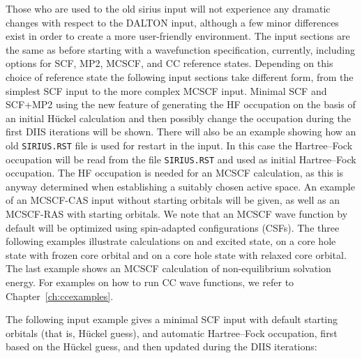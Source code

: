 Those who are used to the old {\sc sirius} input will not
experience any dramatic changes with respect to the DALTON input,
although a few minor differences exist in order to create a more
user-friendly environment. The input sections are the same as
before starting with a wavefunction specification, currently,
including options for SCF, MP2, MCSCF, and CC reference states.
Depending on this choice of reference state the following input
sections take different form, from the simplest SCF input to the
more complex MCSCF input. Minimal SCF and SCF+MP2
using the new feature of generating the HF
occupation on the basis of an initial H\"{u}ckel
calculation and then possibly change the
occupation during the first DIIS iterations will be
shown. There will also be an example showing how an old
\verb|SIRIUS.RST| file is used for restart in the
input. 
In this case the Hartree--Fock occupation will be read from
the file \verb|SIRIUS.RST| and used as initial Hartree--Fock
occupation.
The HF occupation is
needed for an MCSCF calculation, as this is anyway
determined when establishing a suitably chosen active
space. An example of an
MCSCF-CAS input without starting
orbitals will be given, as well as an
MCSCF-RAS with starting orbitals. We note that an
MCSCF wave function by default will be optimized using
spin-adapted configurations
(CSFs).
The three
following examples illustrate calculations on and excited
state, on a core hole state
with frozen core orbital and on a core hole
state with relaxed core orbital. The last
example shows an MCSCF calculation of non-equilibrium solvation
energy. For examples on how to run CC
wave functions, we refer to Chapter~\ref{ch:ccexamples}.

\bigskip

The following input example gives a minimal
SCF input with default
starting  orbitals (that is, H\"{u}ckel guess), and automatic Hartree--Fock
occupation, first based on the H\"{u}ckel guess, and
then updated during the DIIS iterations:

